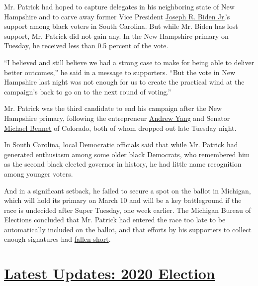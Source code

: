 Mr. Patrick had hoped to capture delegates in his neighboring state of
New Hampshire and to carve away former Vice President
\href{https://www.nytimes.com/interactive/2020/us/elections/joe-biden.html}{Joseph
R. Biden Jr.}'s support among black voters in South Carolina. But while
Mr. Biden has lost support, Mr. Patrick did not gain any. In the New
Hampshire primary on Tuesday,
\href{https://www.nytimes.com/interactive/2020/02/11/us/elections/results-new-hampshire-primary-election.html}{he
received less than 0.5 percent of the vote}.

``I believed and still believe we had a strong case to make for being
able to deliver better outcomes,'' he said in a message to supporters.
``But the vote in New Hampshire last night was not enough for us to
create the practical wind at the campaign's back to go on to the next
round of voting.''

Mr. Patrick was the third candidate to end his campaign after the New
Hampshire primary, following the entrepreneur
\href{https://www.nytimes.com/2020/02/11/us/politics/andrew-yang-drops-out.html}{Andrew
Yang} and Senator
\href{https://www.nytimes.com/2020/02/11/us/politics/michael-bennet-drops-out.html}{Michael
Bennet} of Colorado, both of whom dropped out late Tuesday night.

In South Carolina, local Democratic officials said that while Mr.
Patrick had generated enthusiasm among some older black Democrats, who
remembered him as the second black elected governor in history, he had
little name recognition among younger voters.

And in a significant setback, he failed to secure a spot on the ballot
in Michigan, which will hold its primary on March 10 and will be a key
battleground if the race is undecided after Super Tuesday, one week
earlier. The Michigan Bureau of Elections concluded that Mr. Patrick had
entered the race too late to be automatically included on the ballot,
and that efforts by his supporters to collect enough signatures had
\href{https://www.michigan.gov/documents/sos/122719_Patrick_Staff_Report_Final_Draft_674771_7.pdf}{fallen
short}.

\hypertarget{latest-updates-2020-election}{%
\section{\texorpdfstring{\href{https://www.nytimes.com/2020/07/31/us/elections/biden-vs-trump.html?action=click\&pgtype=Article\&state=default\&region=MAIN_CONTENT_1\&context=storylines_live_updates}{Latest
Updates: 2020
Election}}{Latest Updates: 2020 Election}}\label{latest-updates-2020-election}}

